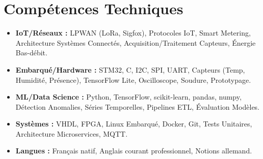 \documentclass[a4paper,11pt]{article}
\begin{document}
\section{Comp\'etences Techniques}
\begin{itemize}[leftmargin=*, nosep]
    \item \small{\textbf{IoT/R\'eseaux :} LPWAN (LoRa, Sigfox), Protocoles IoT, Smart Metering, Architecture Syst\`emes Connect\'es, Acquisition/Traitement Capteurs, \'Energie Bas-d\'ebit.}
    \item \small{\textbf{Embarqu\'e/Hardware :} STM32, C, I2C, SPI, UART, Capteurs (Temp, Humidit\'e, Pr\'esence), TensorFlow Lite, Oscilloscope, Soudure, Prototypage.}
    \item \small{\textbf{ML/Data Science :} Python, TensorFlow, scikit-learn, pandas, numpy, D\'etection Anomalies, S\'eries Temporelles, Pipelines ETL, \'Evaluation Mod\`eles.}
    \item \small{\textbf{Syst\`emes :} VHDL, FPGA, Linux Embarqu\'e, Docker, Git, Tests Unitaires, Architecture Microservices, MQTT.}
    \item \small{\textbf{Langues :} Fran\c{c}ais natif, Anglais courant professionnel, Notions allemand.}
\end{itemize}
\end{document}
